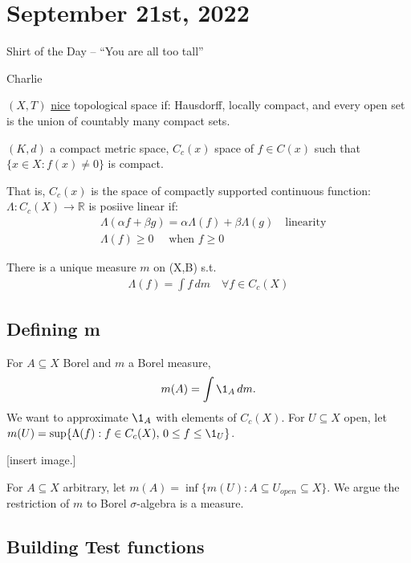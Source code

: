 \section{September 21st, 2022}

\epigraph{Shirt of the Day -- ``You are all too tall''}{Charlie}

\begin{definition}
	$(X,T)$ \underline{nice} topological space if: Hausdorff, locally compact, and every open set is the union of countably many compact sets.
\end{definition}

\begin{example}
	$(K,d)$ a compact metric space, $C_c (x)$ space of $f \in C(x)$ such that $\{x\in X: f(x) \neq 0 \}$ is compact.

	That is, $C_c (x)$ is the space of compactly supported continuous function:
		$\Lambda : C_c(X) \to \mathbb{R}$ is posiive linear if:
	\begin{align*}
		&\Lambda(\alpha f + \beta g) = \alpha \Lambda(f) + \beta \Lambda(g) \quad \text{linearity} \\
		&\Lambda(f) \geq 0 \quad \text{ when } f \geq 0
	\end{align*}
\end{example}

\begin{theorem}
	There is a unique measure $m$ on (X,B) s.t.
	\begin{align*}
		\Lambda(f) = \int f \, dm \quad \forall f \in C_c (X)
	\end{align*}
\end{theorem}

\subsection{Defining m}
For $A \subseteq X$ Borel and $m$ a Borel measure, 
	\[
		m(A) = \int \1_{A} \, dm.
	\]
We want to approximate $\1_A$ with elements of $C_c (X)$.
For $U \subseteq X $ open, let $m(U) = \sup\{\Lambda (f) : f \in C_c (X), \, 0 \leq f \leq \1_{U} \}$.

[insert image.]

For $A \subseteq X$ arbitrary, let $m(A) = \inf\{m(U) : A \subseteq U_{open} \subseteq X\}$.
We argue the restriction of $m$ to Borel $\sigma$-algebra is a measure.

\subsection{Building Test functions}

